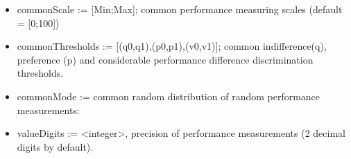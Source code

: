 \documentclass[letterpaper,10pt,english]{sphinxmanual}
\begin{document}
\begin{fulllineitems}
\begin{description}
\begin{itemize}
\item {} 
commonScale := {[}Min;Max{]}; common performance measuring scales (default = {[}0;100{]})

\item {} 
commonThresholds := {[}(q0,q1),(p0,p1),(v0,v1){]}; common indifference(q), preference (p)
and considerable performance difference discrimination thresholds.

\item {} \begin{description}
\item[{commonMode := common random distribution of random performance measurements:}] \leavevmode
{}

\end{description}

\item {} 
valueDigits := \textless{}integer\textgreater{}, precision of performance measurements
(2 decimal digits by default).

\end{itemize}


\end{description}
\end{fulllineitems}
\end{document}
